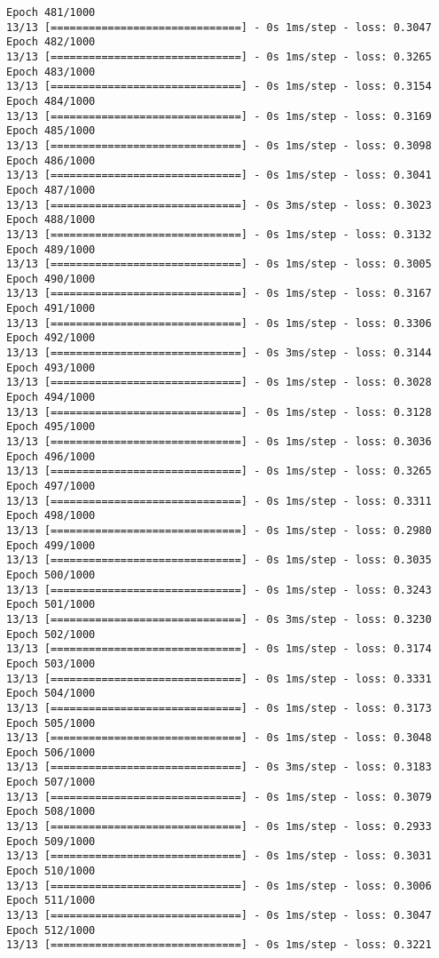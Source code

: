 \documentclass[11pt]{article}
\begin{document}
\begin{Verbatim}[commandchars=\\\{\}]
Epoch 481/1000
13/13 [==============================] - 0s 1ms/step - loss: 0.3047
Epoch 482/1000
13/13 [==============================] - 0s 1ms/step - loss: 0.3265
Epoch 483/1000
13/13 [==============================] - 0s 1ms/step - loss: 0.3154
Epoch 484/1000
13/13 [==============================] - 0s 1ms/step - loss: 0.3169
Epoch 485/1000
13/13 [==============================] - 0s 1ms/step - loss: 0.3098
Epoch 486/1000
13/13 [==============================] - 0s 1ms/step - loss: 0.3041
Epoch 487/1000
13/13 [==============================] - 0s 3ms/step - loss: 0.3023
Epoch 488/1000
13/13 [==============================] - 0s 1ms/step - loss: 0.3132
Epoch 489/1000
13/13 [==============================] - 0s 1ms/step - loss: 0.3005
Epoch 490/1000
13/13 [==============================] - 0s 1ms/step - loss: 0.3167
Epoch 491/1000
13/13 [==============================] - 0s 1ms/step - loss: 0.3306
Epoch 492/1000
13/13 [==============================] - 0s 3ms/step - loss: 0.3144
Epoch 493/1000
13/13 [==============================] - 0s 1ms/step - loss: 0.3028
Epoch 494/1000
13/13 [==============================] - 0s 1ms/step - loss: 0.3128
Epoch 495/1000
13/13 [==============================] - 0s 1ms/step - loss: 0.3036
Epoch 496/1000
13/13 [==============================] - 0s 1ms/step - loss: 0.3265
Epoch 497/1000
13/13 [==============================] - 0s 1ms/step - loss: 0.3311
Epoch 498/1000
13/13 [==============================] - 0s 1ms/step - loss: 0.2980
Epoch 499/1000
13/13 [==============================] - 0s 1ms/step - loss: 0.3035
Epoch 500/1000
13/13 [==============================] - 0s 1ms/step - loss: 0.3243
Epoch 501/1000
13/13 [==============================] - 0s 3ms/step - loss: 0.3230
Epoch 502/1000
13/13 [==============================] - 0s 1ms/step - loss: 0.3174
Epoch 503/1000
13/13 [==============================] - 0s 1ms/step - loss: 0.3331
Epoch 504/1000
13/13 [==============================] - 0s 1ms/step - loss: 0.3173
Epoch 505/1000
13/13 [==============================] - 0s 1ms/step - loss: 0.3048
Epoch 506/1000
13/13 [==============================] - 0s 3ms/step - loss: 0.3183
Epoch 507/1000
13/13 [==============================] - 0s 1ms/step - loss: 0.3079
Epoch 508/1000
13/13 [==============================] - 0s 1ms/step - loss: 0.2933
Epoch 509/1000
13/13 [==============================] - 0s 1ms/step - loss: 0.3031
Epoch 510/1000
13/13 [==============================] - 0s 1ms/step - loss: 0.3006
Epoch 511/1000
13/13 [==============================] - 0s 1ms/step - loss: 0.3047
Epoch 512/1000
13/13 [==============================] - 0s 1ms/step - loss: 0.3221

\end{Verbatim}
\end{document}
